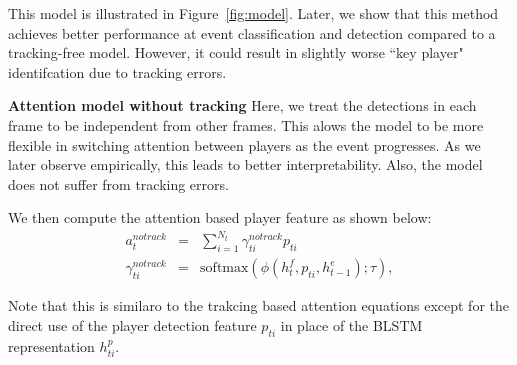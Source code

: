 This model is illustrated in Figure~\ref{fig:model}.
Later, we show that this method achieves better
performance at event classification and detection compared to a
tracking-free model. However, it could result in slightly worse ``key player"
identifcation due to tracking errors.

\noindent \textbf{Attention model without tracking}
Here, we treat the detections in each frame to be independent from other
frames.  This alows the model to be more flexible in switching attention
between players as the event progresses.  As we later observe empirically, this
leads to better interpretability.  Also, the model does not suffer from
tracking errors.

We then compute the attention based player feature as shown below:
\begin{eqnarray} 
\label{eq:notrack}
  a_t^{notrack} & = & \sum_{i=1}^{N_t} \gamma_{ti}^{notrack} p_{ti}
\\ \nonumber
  \gamma_{ti}^{notrack} & = & \text{softmax} \left(\phi\left(h^f_t, p_{ti}, h^e_{t-1}\right); \tau\right),
\end{eqnarray}

Note that this is similaro to the trakcing based attention equations except for
the direct use of the player detection feature $p_{ti}$ in place of the
BLSTM representation $h_{ti}^p$.
